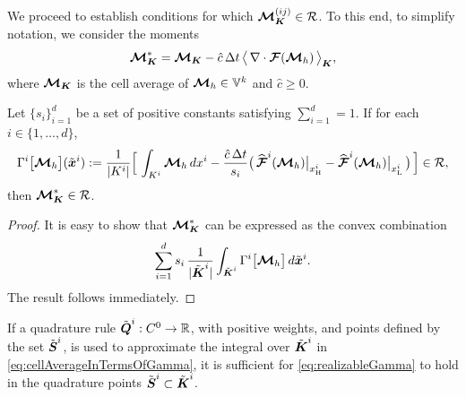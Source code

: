 We proceed to establish conditions for which $\boldsymbol{\mathcal{M}}_{\boldsymbol{K}}^{(ij)}\in\mathcal{R}$.  
To this end, to simplify notation, we consider the moments
\begin{equation}
  \boldsymbol{\mathcal{M}}_{\boldsymbol{K}}^{*}
  =\boldsymbol{\mathcal{M}}_{\boldsymbol{K}}-\hat{c}\,\Delta t\,\big\langle\,\nabla\cdot\boldsymbol{\mathcal{F}}(\boldsymbol{\mathcal{M}}_{h})\,\big\rangle_{\boldsymbol{K}},
\end{equation}
where $\boldsymbol{\mathcal{M}}_{\boldsymbol{K}}$ is the cell average of $\boldsymbol{\mathcal{M}}_{h}\in\mathbb{V}^{k}$ and $\hat{c}\ge0$.  
\begin{lemma}
  Let $\{s_{i}\}_{i=1}^{d}$ be a set of positive constants satisfying $\sum_{i=1}^{d}=1$.  
  If for each $i\in\{1,\ldots,d\}$, 
  \begin{equation}
    \Gamma^{i}\big[\boldsymbol{\mathcal{M}}_{h}\big](\tilde{\boldsymbol{x}}^{i})
    :=\frac{1}{|K^{i}|}
    \Big[\,\int_{K^{i}}\boldsymbol{\mathcal{M}}_{h}\,dx^{i}-\frac{\hat{c}\,\Delta t}{s_{i}}\big(\,\widehat{\boldsymbol{\mathcal{F}}}^{i}(\boldsymbol{\mathcal{M}}_{h})\big|_{x_{\mbox{\tiny H}}^{i}}-\widehat{\boldsymbol{\mathcal{F}}}^{i}(\boldsymbol{\mathcal{M}}_{h})\big|_{x_{\mbox{\tiny L}}^{i}}\,\big)\,\Big]\in\mathcal{R},
    \label{eq:realizableGamma}
  \end{equation}
  then $\boldsymbol{\mathcal{M}}_{\boldsymbol{K}}^{*}\in\mathcal{R}$.  
\end{lemma}
\begin{proof}
  It is easy to show that $\boldsymbol{\mathcal{M}}_{\boldsymbol{K}}^{*}$ can be expressed as the convex combination
  \begin{equation}
    \sum_{i=1}^{d}s_{i}\,\frac{1}{|\tilde{\boldsymbol{\boldsymbol{K}}}^{i}|}\int_{\tilde{\boldsymbol{K}}^{i}}\Gamma^{i}\big[\boldsymbol{\mathcal{M}}_{h}\big]\,d\tilde{\boldsymbol{x}}^{i}.  
    \label{eq:cellAverageInTermsOfGamma}
  \end{equation}
  The result follows immediately.  
\end{proof}
\begin{rem}
  If a quadrature rule $\tilde{\boldsymbol{Q}}^{i}:C^{0}\to\mathbb{R}$, with positive weights, and points defined by the set $\tilde{\boldsymbol{S}}^{i}$, is used to approximate the integral over $\tilde{\boldsymbol{K}}^{i}$ in \eqref{eq:cellAverageInTermsOfGamma}, it is sufficient for \eqref{eq:realizableGamma} to hold in the quadrature points $\tilde{\boldsymbol{S}}^{i}\subset\tilde{\boldsymbol{K}}^{i}$.  
\end{rem}